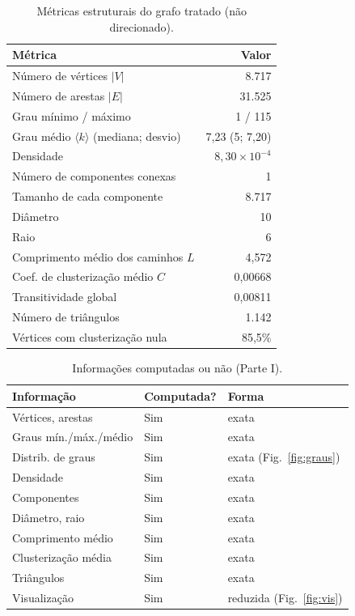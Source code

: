 \documentclass[sigconf]{webmedia}
\begin{document}
\begin{table}[t]
\caption{Métricas estruturais do grafo tratado (não direcionado).}
\label{tab:p1}
\begin{tabular}{lr}
\toprule
Métrica & Valor \\
\midrule
Número de vértices $|V|$ & 8.717 \\
Número de arestas $|E|$ & 31.525 \\
Grau mínimo / máximo & 1 / 115 \\
Grau médio $\langle k\rangle$ (mediana; desvio) & 7,23 (5; 7,20) \\
Densidade & $8{,}30\times10^{-4}$ \\
Número de componentes conexas & 1 \\
Tamanho de cada componente & 8.717 \\
Diâmetro & 10 \\
Raio & 6 \\
Comprimento médio dos caminhos $L$ & 4,572 \\
Coef. de clusterização médio $C$ & 0,00668 \\
Transitividade global & 0,00811 \\
Número de triângulos & 1.142 \\
Vértices com clusterização nula & 85,5\% \\
\bottomrule
\end{tabular}
\end{table}

\begin{table}[t]
\caption{Informações computadas ou não (Parte I).}
\label{tab:computado}
\begin{tabular}{@{}lll@{}}
\toprule
Informação & Computada? & Forma \\
\midrule
Vértices, arestas & Sim & exata \\
Graus mín./máx./médio & Sim & exata \\
Distrib. de graus & Sim & exata (Fig.~\ref{fig:graus}) \\
Densidade & Sim & exata \\
Componentes & Sim & exata \\
Diâmetro, raio & Sim & exata \\
Comprimento médio & Sim & exata \\
Clusterização média & Sim & exata \\
Triângulos & Sim & exata \\
Visualização & Sim & reduzida (Fig.~\ref{fig:vis}) \\
\bottomrule
\end{tabular}
\end{table}
\end{document}
